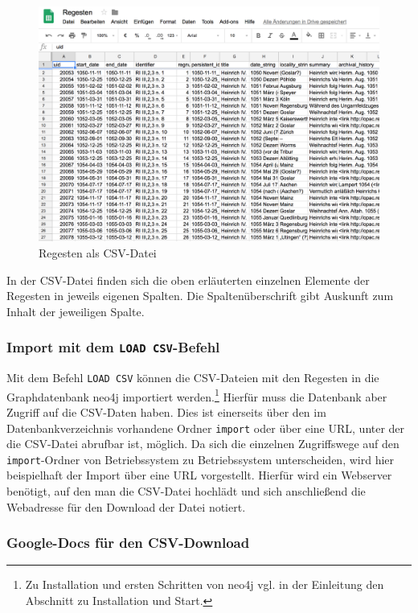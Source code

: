 \documentclass[12pt,ngerman,]{article}
\begin{document}
\begin{figure}
\centering
\includegraphics{Bilder/RI2Graph/ReggH4-Regestentabelle.png}
\caption{Regesten als CSV-Datei}
\end{figure}

In der CSV-Datei finden sich die oben erläuterten einzelnen Elemente der
Regesten in jeweils eigenen Spalten. Die Spaltenüberschrift gibt
Auskunft zum Inhalt der jeweiligen Spalte.

\subsubsection{\texorpdfstring{Import mit dem
\texttt{LOAD\ CSV}-Befehl}{Import mit dem LOAD CSV-Befehl}}\label{import-mit-dem-load-csv-befehl}

Mit dem Befehl \texttt{LOAD\ CSV} können die CSV-Dateien mit den
Regesten in die Graphdatenbank neo4j importiert werden.\footnote{Zu
  Installation und ersten Schritten von neo4j vgl. in der Einleitung den
  Abschnitt zu Installation und Start.} Hierfür muss die Datenbank aber
Zugriff auf die CSV-Daten haben. Dies ist einerseits über den im
Datenbankverzeichnis vorhandene Ordner \texttt{import} oder über eine
URL, unter der die CSV-Datei abrufbar ist, möglich. Da sich die
einzelnen Zugriffswege auf den \texttt{import}-Ordner von Betriebssystem
zu Betriebssystem unterscheiden, wird hier beispielhaft der Import über
eine URL vorgestellt. Hierfür wird ein Webserver benötigt, auf den man
die CSV-Datei hochlädt und sich anschließend die Webadresse für den
Download der Datei notiert.

\subsubsection{Google-Docs für den
CSV-Download}\label{google-docs-fuxfcr-den-csv-download}
\end{document}
